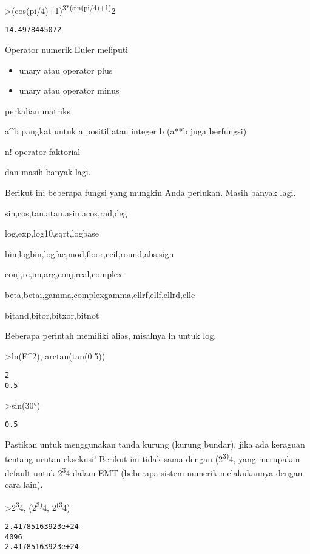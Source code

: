 \documentclass[
]{book}
\begin{document}
\textgreater(cos(pi/4)+1)\textsuperscript{3*(sin(pi/4)+1)}2

\begin{verbatim}
14.4978445072
\end{verbatim}

Operator numerik Euler meliputi

\begin{itemize}
\item
  unary atau operator plus
\item
  unary atau operator minus
\end{itemize}

perkalian matriks

a\^{}b pangkat untuk a positif atau integer b (a**b juga berfungsi)

n! operator faktorial

dan masih banyak lagi.

Berikut ini beberapa fungsi yang mungkin Anda perlukan. Masih banyak lagi.

sin,cos,tan,atan,asin,acos,rad,deg

log,exp,log10,sqrt,logbase

bin,logbin,logfac,mod,floor,ceil,round,abs,sign

conj,re,im,arg,conj,real,complex

beta,betai,gamma,complexgamma,ellrf,ellf,ellrd,elle

bitand,bitor,bitxor,bitnot

Beberapa perintah memiliki alias, misalnya ln untuk log.

\textgreater ln(E\^{}2), arctan(tan(0.5))

\begin{verbatim}
2
0.5
\end{verbatim}

\textgreater sin(30°)

\begin{verbatim}
0.5
\end{verbatim}

Pastikan untuk menggunakan tanda kurung (kurung bundar), jika ada keraguan tentang urutan eksekusi! Berikut ini tidak sama dengan (2\textsuperscript{3)}4, yang merupakan default untuk 2\textsuperscript{3}4 dalam EMT (beberapa sistem numerik melakukannya dengan cara lain).

\textgreater2\textsuperscript{3}4, (2\textsuperscript{3)}4, 2\textsuperscript{(3}4)

\begin{verbatim}
2.41785163923e+24
4096
2.41785163923e+24
\end{verbatim}
\end{document}
